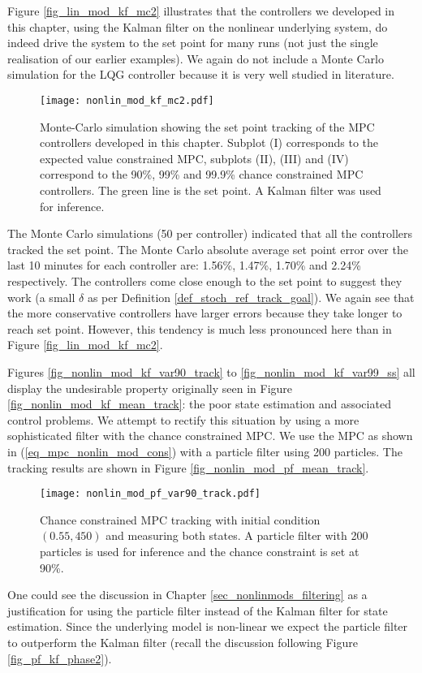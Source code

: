 Figure \ref{fig_lin_mod_kf_mc2} illustrates that the controllers we developed in this chapter, using the Kalman filter on the nonlinear underlying system, do indeed drive the system to the set point for many runs (not just the single realisation of our earlier examples). We again do not include a Monte Carlo simulation for the LQG controller because it is very well studied in literature.
\begin{figure}[H] 
\centering
\texttt{[image: nonlin\_mod\_kf\_mc2.pdf]}
\caption{Monte-Carlo simulation showing the set point tracking of the MPC controllers developed in this chapter. Subplot (I) corresponds to the expected value constrained MPC, subplots (II), (III) and (IV) correspond to the 90\%, 99\% and 99.9\% chance constrained MPC controllers. The green line is the set point. A Kalman filter was used for inference.}
\label{fig_nonlin_mod_kf_mc2}
\end{figure}
The Monte Carlo simulations (50 per controller) indicated that all the controllers tracked the set point. The Monte Carlo absolute average set point error over the last 10 minutes for each controller are: 1.56\%, 1.47\%, 1.70\% and 2.24\% respectively. The controllers come close enough to the set point to suggest they work (a small $\delta$ as per Definition \ref{def_stoch_ref_track_goal}). We again see that the more conservative controllers have larger errors because they take longer to reach set point. However, this tendency is much less pronounced here than in Figure \ref{fig_lin_mod_kf_mc2}.

Figures \ref{fig_nonlin_mod_kf_var90_track} to \ref{fig_nonlin_mod_kf_var99_ss} all display the undesirable property originally seen in Figure \ref{fig_nonlin_mod_kf_mean_track}: the poor state estimation and associated control problems. We attempt to rectify this situation by using a more sophisticated filter with the chance constrained MPC. We use the MPC as shown in (\ref{eq_mpc_nonlin_mod_cons}) with a particle filter using 200 particles. The tracking results are shown in Figure \ref{fig_nonlin_mod_pf_mean_track}. 
\begin{figure}[H] 
\centering
\texttt{[image: nonlin\_mod\_pf\_var90\_track.pdf]}
\caption{Chance constrained MPC tracking with initial condition $(0.55, 450)$ and measuring both states. A particle filter with 200 particles is used for inference and the chance constraint is set at 90\%.}
\label{fig_nonlin_mod_pf_var90_track}
\end{figure}
One could see the discussion in Chapter \ref{sec_nonlinmods_filtering} as a justification for using the particle filter instead of the Kalman filter for state estimation. Since the underlying model is non-linear we expect the particle filter to outperform the Kalman filter (recall the discussion following Figure \ref{fig_pf_kf_phase2}).

